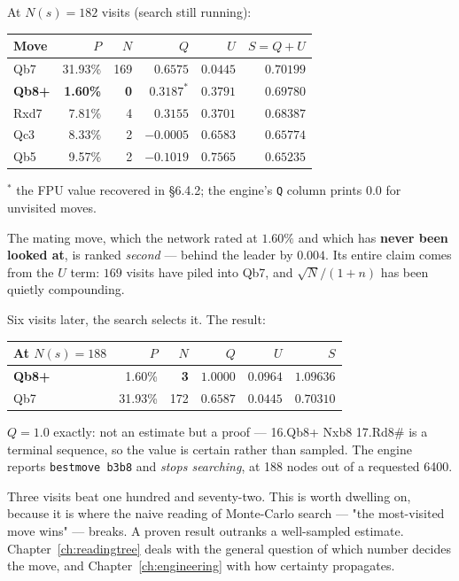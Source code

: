 \begin{realdata}[title={Real engine output: Morphy position, ranked by PUCT score $S$}]
At $N(s) = 182$ visits (search still running):
\begin{center}
\begin{tabular}{@{}lrrrrr@{}}
\toprule
Move & $P$ & $N$ & $Q$ & $U$ & $S = Q+U$ \\
\midrule
Qb7   & 31.93\% & 169 & $0.6575$ & $0.0445$ & $\mathbf{0.70199}$ \\
\textbf{Qb8+} & \textbf{1.60\%} & \textbf{0} & $0.3187^{*}$ & $0.3791$ & $\mathbf{0.69780}$ \\
Rxd7  &  7.81\% &   4 & $0.3155$ & $0.3701$ & $0.68387$ \\
Qc3   &  8.33\% &   2 & $-0.0005$ & $0.6583$ & $0.65774$ \\
Qb5   &  9.57\% &   2 & $-0.1019$ & $0.7565$ & $0.65235$ \\
\bottomrule
\end{tabular}
\end{center}
\footnotesize $^{*}$ the FPU value recovered in §6.4.2; the engine's \texttt{Q} column prints
$0.0$ for unvisited moves.
\normalsize

\medskip
The mating move, which the network rated at $1.60\%$ and which has \textbf{never been
looked at}, is ranked \emph{second} --- behind the leader by $0.004$. Its entire claim comes
from the $U$ term: $169$ visits have piled into Qb7, and $\sqrt{N}/(1+n)$ has been quietly
compounding.

Six visits later, the search selects it. The result:
\begin{center}
\begin{tabular}{@{}lrrrrr@{}}
\toprule
At $N(s) = 188$ & $P$ & $N$ & $Q$ & $U$ & $S$ \\
\midrule
\textbf{Qb8+} & 1.60\% & \textbf{3} & $\mathbf{1.0000}$ & $0.0964$ & $\mathbf{1.09636}$ \\
Qb7   & 31.93\% & 172 & $0.6587$ & $0.0445$ & $0.70310$ \\
\bottomrule
\end{tabular}
\end{center}
$Q = 1.0$ exactly: not an estimate but a proof --- 16.Qb8+ Nxb8 17.Rd8\# is a terminal
sequence, so the value is certain rather than sampled. The engine reports
\texttt{bestmove b3b8} and \emph{stops searching}, at 188 nodes out of a requested 6400.
\end{realdata}

\begin{keyidea}
Three visits beat one hundred and seventy-two. This is worth dwelling on, because it is where
the naive reading of Monte-Carlo search --- "the most-visited move wins" --- breaks. A proven
result outranks a well-sampled estimate. Chapter~\ref{ch:readingtree} deals with the general
question of which number decides the move, and Chapter~\ref{ch:engineering} with how
certainty propagates.
\end{keyidea}

